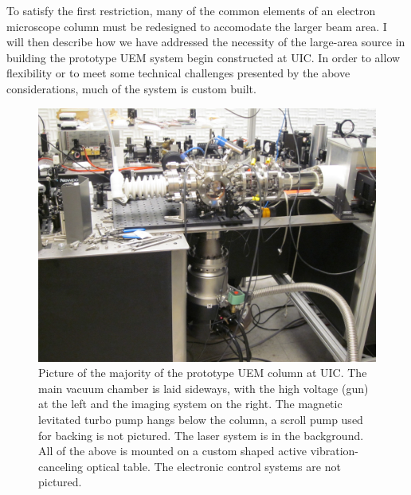 
To satisfy the first restriction, many of the common elements of an electron microscope column must be redesigned to accomodate the larger beam area.
I will then describe how we have addressed the necessity of the large-area source in building the prototype UEM system begin constructed at UIC.
In order to allow flexibility or to meet some technical challenges presented by the above considerations, much of the system is custom built.


\begin{figure}
  \centering
  \includegraphics{inc/hardware/column.jpg}
  \caption[Picture of the prototype UEM column at UIC]{
    Picture of the majority of the prototype UEM column at UIC.
    The main vacuum chamber is laid sideways, with the high voltage (gun) at the left and the imaging system on the right.
    The magnetic levitated turbo pump hangs below the column, a scroll pump used for backing is not pictured.
    The laser system is in the background.
    All of the above is mounted on a custom shaped active vibration-canceling optical table.
    The electronic control systems are not pictured.
  }
  \label{fig:column-pic}
\end{figure}



